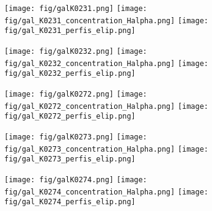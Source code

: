 \begin{figure}[!ht]
\begin{center}
\setcaptionmargin{1cm}
\texttt{[image: fig/galK0231.png]}
\texttt{[image: fig/gal\_K0231\_concentration\_Halpha.png]}
\texttt{[image: fig/gal\_K0231\_perfis\_elip.png]}
\end{center}
\end{figure}


\begin{figure}[!ht]
\begin{center}
\setcaptionmargin{1cm}
\texttt{[image: fig/galK0232.png]}
\texttt{[image: fig/gal\_K0232\_concentration\_Halpha.png]}
\texttt{[image: fig/gal\_K0232\_perfis\_elip.png]}
\end{center}
\end{figure}


\begin{figure}[!ht]
\begin{center}
\setcaptionmargin{1cm}
\texttt{[image: fig/galK0272.png]}
\texttt{[image: fig/gal\_K0272\_concentration\_Halpha.png]}
\texttt{[image: fig/gal\_K0272\_perfis\_elip.png]}
\end{center}
\end{figure}


\begin{figure}[!ht]
\begin{center}
\setcaptionmargin{1cm}
\texttt{[image: fig/galK0273.png]}
\texttt{[image: fig/gal\_K0273\_concentration\_Halpha.png]}
\texttt{[image: fig/gal\_K0273\_perfis\_elip.png]}
\end{center}
\end{figure}


\begin{figure}[!ht]
\begin{center}
\setcaptionmargin{1cm}
\texttt{[image: fig/galK0274.png]}
\texttt{[image: fig/gal\_K0274\_concentration\_Halpha.png]}
\texttt{[image: fig/gal\_K0274\_perfis\_elip.png]}
\end{center}
\end{figure}


